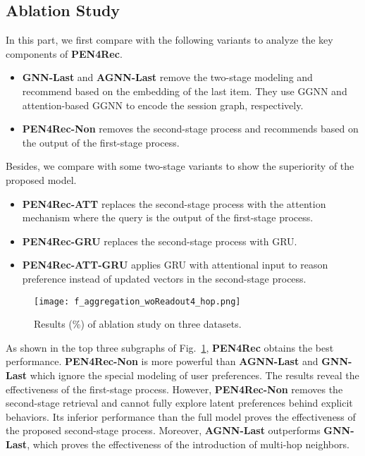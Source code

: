 \documentclass[runningheads]{llncs}
\begin{document}
  

\subsection{Ablation Study}
In this part, we first compare with the following variants to analyze the key components of \textbf{PEN4Rec}.
\begin{itemize}
\item 
  \textbf{GNN-Last} and \textbf{AGNN-Last} remove the two-stage modeling and recommend based on the embedding of the last item. They use GGNN and attention-based GGNN to encode the session graph, respectively.
  \item
  \textbf{PEN4Rec-Non} removes the second-stage process and recommends based on the output of the first-stage process. 
  \end{itemize}
  

Besides, we compare with some two-stage variants to show the superiority of the proposed model. 
\begin{itemize}
  \item \textbf{PEN4Rec-ATT} replaces the second-stage process with the attention mechanism where the query is the output of the first-stage process.
  \item
  \textbf{PEN4Rec-GRU} replaces the second-stage process with GRU.
\item 
  \textbf{PEN4Rec-ATT-GRU} applies GRU with attentional input to reason preference instead of updated vectors in the second-stage process. 
\end{itemize}
  
\begin{figure}[t]
  \centering
  \texttt{[image: f\_aggregation\_woReadout4\_hop.png]} \caption{Results (\%) of ablation study on three datasets.} 
  \label{fig:agg}
\end{figure}
As shown in the top three subgraphs of Fig.~\ref{fig:agg}, \textbf{PEN4Rec} obtains the best performance. \textbf{PEN4Rec-Non} is more powerful than \textbf{AGNN-Last} and \textbf{GNN-Last} which ignore the special modeling of user preferences. The results reveal the effectiveness of the first-stage process.
However, \textbf{PEN4Rec-Non} removes the second-stage retrieval and cannot fully explore latent preferences behind explicit behaviors.  
Its inferior performance than the full model proves the effectiveness of the proposed second-stage process.
Moreover, \textbf{AGNN-Last} outperforms \textbf{GNN-Last}, which proves the effectiveness of the introduction of multi-hop neighbors.
 
\end{document}
